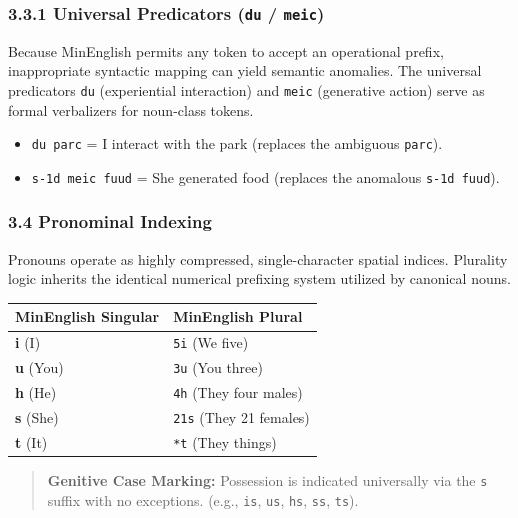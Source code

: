 \subsubsection{\texorpdfstring{3.3.1 Universal Predicators (\texttt{du}
/
\texttt{meic})}{3.3.1 Universal Predicators (du / meic)}}\label{universal-predicators-du-meic}

Because MinEnglish permits any token to accept an operational prefix,
inappropriate syntactic mapping can yield semantic anomalies. The
universal predicators \texttt{du} (experiential interaction) and
\texttt{meic} (generative action) serve as formal verbalizers for
noun-class tokens.

\begin{itemize}
\tightlist
\item
  \texttt{du\ parc} = I interact with the park (replaces the ambiguous
  \texttt{parc}).
\item
  \texttt{s-1d\ meic\ fuud} = She generated food (replaces the anomalous
  \texttt{s-1d\ fuud}).
\end{itemize}

\subsubsection{3.4 Pronominal Indexing}\label{pronominal-indexing}

Pronouns operate as highly compressed, single-character spatial indices.
Plurality logic inherits the identical numerical prefixing system
utilized by canonical nouns.

{\def\LTcaptype{} %
\begin{longtable}[]{@{}ll@{}}
\toprule\noalign{}
MinEnglish Singular & MinEnglish Plural \\
\midrule\noalign{}
\endhead
\bottomrule\noalign{}
\endlastfoot
\textbf{i} (I) & \texttt{5i} (We five) \\
\textbf{u} (You) & \texttt{3u} (You three) \\
\textbf{h} (He) & \texttt{4h} (They four males) \\
\textbf{s} (She) & \texttt{21s} (They 21 females) \\
\textbf{t} (It) & \texttt{*t} (They things) \\
\end{longtable}
}

\begin{quote}
\textbf{Genitive Case Marking:} Possession is indicated universally via
the \texttt{\textquotesingle{}s} suffix with no exceptions. (e.g.,
\texttt{i\textquotesingle{}s}, \texttt{u\textquotesingle{}s},
\texttt{h\textquotesingle{}s}, \texttt{s\textquotesingle{}s},
\texttt{t\textquotesingle{}s}).
\end{quote}

